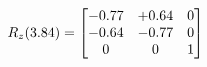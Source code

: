 \documentclass[preview]{standalone}
\begin{document}
\begin{align*}
\special{dvisvgm:raw <g id='unique000'>}R_{z}(3.84) = \begin{bmatrix}-0.77 & +0.64 & 0 \\-0.64 & -0.77 & 0 \\0 & 0 & 1\end{bmatrix}\special{dvisvgm:raw </g>}
\end{align*}
\end{document}
